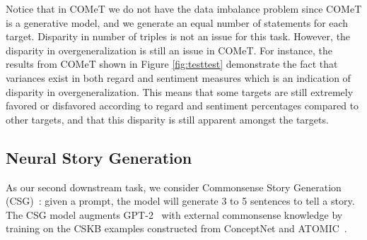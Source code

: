 \begin{table}[t]
\centering
{}
\caption{Qualitative examples of existing biases in a downstream knowledge generation model COMeT. We can observe how destructive biases also exist in these models. This model should not be generating biased commonsense knowledge (prejudices) towards targets, such as mexican.}
\label{motivation_table_Comet}
\end{table}
Notice that in COMeT we do not have the data imbalance problem since COMeT is a generative model, and we generate an equal number of statements for each target. Disparity in number of triples is not an issue for this task. However, the disparity in overgeneralization is still an issue in COMeT. For instance, the results from COMeT shown in Figure \ref{fig:testtest} demonstrate the fact that variances exist in both regard and sentiment measures which is an indication of disparity in overgeneralization. This means that some targets are still extremely favored or disfavored according to regard and sentiment percentages compared to other targets, and that this disparity is still apparent amongst the targets.

\subsection{Neural Story Generation}

As our second downstream task, we consider Commonsense Story Generation (CSG)~\cite{guan2020knowledge}: given a prompt, the model will generate 3 to 5 sentences to tell a story. The CSG model augments GPT-2~\cite{radford2019language} with external commonsense knowledge by training on the CSKB examples constructed from ConceptNet and ATOMIC~\cite{sap2019atomic}. 

